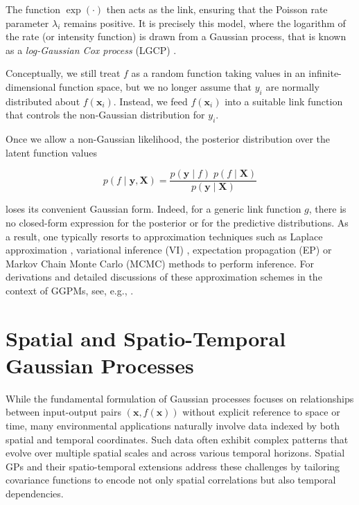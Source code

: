 The function $\exp (\cdot)$ then acts as the link, ensuring that the Poisson rate parameter $\lambda_i$ remains positive. It is precisely this model, where the logarithm of the rate (or intensity function) is drawn from a Gaussian process, that is known as a \emph{log-Gaussian Cox process} (LGCP) \cite{moller_log_1998}. 

Conceptually, we still treat $f$ as a random function taking values in an infinite-dimensional function space, but we no longer assume that $y_i$ are normally distributed about $f(\bm{x}_i)$. Instead, we feed $f(\bm{x}_i)$ into a suitable link function that controls the non-Gaussian distribution for $y_i$. 

Once we allow a non-Gaussian likelihood, the posterior distribution over the latent function values

\begin{equation}
    p(f \; | \; \bm{y}, \bm{X}) = \frac{p ( \bm{y} \; | \; f ) \; p(f \; | \; \bm{X})}{p( \bm{y} \; | \;\bm{X})}
\end{equation}

loses its convenient Gaussian form. Indeed, for a generic link function $g$, there is no closed-form expression for the posterior or for the predictive distributions. As a result, one typically resorts to approximation techniques such as Laplace approximation \cite[cf.][Section~6.4.6]{bishop_pattern_2006}, variational inference (VI) \cite[cf.][Section~10.1]{bishop_pattern_2006}, expectation propagation (EP) \cite[cf.][Sections~~10.7]{bishop_pattern_2006} or Markov Chain Monte Carlo (MCMC) methods \cite[cf.][Chapter~6]{bishop_pattern_2006} to perform inference. For derivations and detailed discussions of these approximation schemes in the context of GGPMs, see, e.g., \citet{chan_generalized_2011}.


\section{Spatial and Spatio-Temporal Gaussian Processes}\label{sec:gp:spatial}

While the fundamental formulation of Gaussian processes focuses on relationships between input-output pairs $(\bm{x},f(\bm{x}))$ without explicit reference to space or time, many environmental applications naturally involve data indexed by both spatial and temporal coordinates. Such data often exhibit complex patterns that evolve over multiple spatial scales and across various temporal horizons. Spatial GPs and their spatio-temporal extensions address these challenges by tailoring covariance functions to encode not only spatial correlations but also temporal dependencies.

